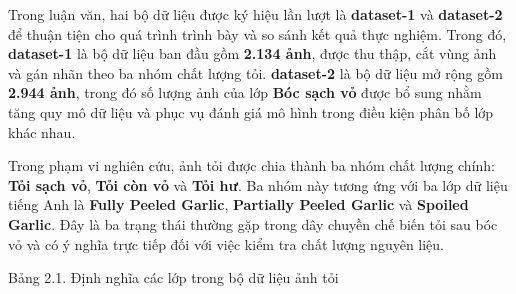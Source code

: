 \documentclass[
]{article}
\begin{document}
Trong luận văn, hai bộ dữ liệu được ký hiệu lần lượt là
\textbf{dataset-1} và \textbf{dataset-2} để thuận tiện cho quá trình
trình bày và so sánh kết quả thực nghiệm. Trong đó, \textbf{dataset-1}
là bộ dữ liệu ban đầu gồm \textbf{2.134 ảnh}, được thu thập, cắt vùng
ảnh và gán nhãn theo ba nhóm chất lượng tỏi. \textbf{dataset-2} là bộ dữ
liệu mở rộng gồm \textbf{2.944 ảnh}, trong đó số lượng ảnh của lớp
\textbf{Bóc sạch vỏ} được bổ sung nhằm tăng quy mô dữ liệu và phục vụ
đánh giá mô hình trong điều kiện phân bố lớp khác nhau.

Trong phạm vi nghiên cứu, ảnh tỏi được chia thành ba nhóm chất lượng
chính: \textbf{Tỏi sạch vỏ}, \textbf{Tỏi còn vỏ} và \textbf{Tỏi hư}. Ba
nhóm này tương ứng với ba lớp dữ liệu tiếng Anh là \textbf{Fully Peeled
Garlic}, \textbf{Partially Peeled Garlic} và \textbf{Spoiled Garlic}.
Đây là ba trạng thái thường gặp trong dây chuyền chế biến tỏi sau bóc vỏ
và có ý nghĩa trực tiếp đối với việc kiểm tra chất lượng nguyên liệu.

Bảng 2.1. Định nghĩa các lớp trong bộ dữ liệu ảnh tỏi
\end{document}
